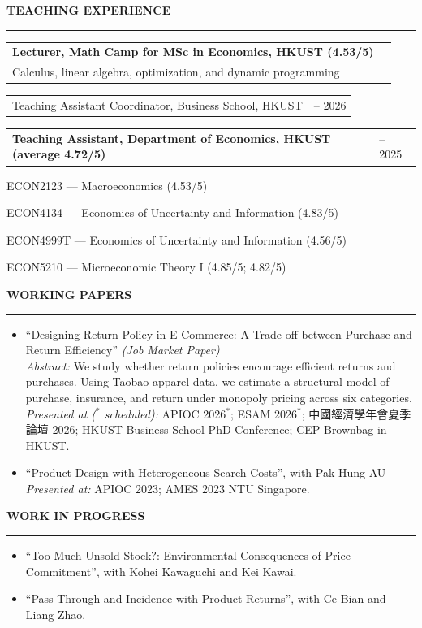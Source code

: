 \documentclass[11pt,letterpaper]{article}
\makeatletter
\newlength{\cvdatecol}
\newcommand{\sectionheader}[1]{%
  \vspace{0.32em}
  {\large\bfseries #1}\\[-0.15em]
  \rule{\textwidth}{0.4pt}\par
  \vspace{0.18em}
}
\newcommand{\cvline}[3][0em]{%
  \par\nobreak
  \noindent\hspace*{#1}%
  \begin{tabularx}{\dimexpr\textwidth-#1\relax}{@{}X@{\hspace{0.75em}}>{\raggedleft\arraybackslash}p{\cvdatecol}@{}}
  #2 & #3 \\
  \end{tabularx}%
}
\newcommand{\courseline}[1]{%
  \par\addvspace{0.22em}%
  \noindent\hspace*{3.2em}#1\par
}
\makeatother
\begin{document}
\vspace{-0.4em}
\sectionheader{TEACHING EXPERIENCE}
{
\cvline[1.5em]{\textbf{Lecturer, Math Camp for MSc in Economics, HKUST (4.53/5)}\\
{\normalsize Calculus, linear algebra, optimization, and dynamic programming}}{2026}
\vspace{0.15em}
\cvline[1.5em]{Teaching Assistant Coordinator, Business School, HKUST}{2025 -- 2026}
\vspace{0.15em}
\cvline[1.5em]{\textbf{Teaching Assistant, Department of Economics, HKUST (average 4.72/5)}}{2020 -- 2025}
\vspace{0.05em}
\courseline{ECON2123 --- Macroeconomics (4.53/5)}
\courseline{ECON4134 --- Economics of Uncertainty and Information (4.83/5)}
\courseline{ECON4999T --- Economics of Uncertainty and Information (4.56/5)}
\courseline{ECON5210 --- Microeconomic Theory I (4.85/5; 4.82/5)}
}

\sectionheader{WORKING PAPERS}
\begin{itemize}
  \item ``Designing Return Policy in E-Commerce: A Trade-off between Purchase and Return Efficiency'' \textit{(Job Market Paper)}\\[0.1em]
  \textit{Abstract:} We study whether return policies encourage efficient returns and purchases. Using Taobao apparel data, we estimate a structural model of purchase, insurance, and return under monopoly pricing across six categories.\\[0.08em]
  \textit{Presented at ($^{\ast}$ scheduled):} APIOC 2026$^{\ast}$; ESAM 2026$^{\ast}$; 中國經濟學年會夏季論壇 2026; HKUST Business School PhD Conference; CEP Brownbag in HKUST.

  \item ``Product Design with Heterogeneous Search Costs'', with Pak Hung AU\\[0.08em]
  \textit{Presented at:} APIOC 2023; AMES 2023 NTU Singapore.
\end{itemize}

\sectionheader{WORK IN PROGRESS}
\begin{itemize}
  \item ``Too Much Unsold Stock?: Environmental Consequences of Price Commitment'', with Kohei Kawaguchi and Kei Kawai.
  \item ``Pass-Through and Incidence with Product Returns'', with Ce Bian and Liang Zhao.
\end{itemize}
\end{document}
